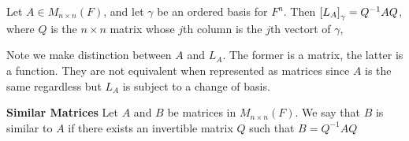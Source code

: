 \documentclass[11pt]{article}
\begin{document}
\begin{corollary*}
    Let $A\in M_{n\times n}(F)$, and let $\gamma$ be an ordered basis for $F^n$. Then $\left[ L_A \right]_{\gamma} = Q^{-1}AQ$, where $Q$ is the $n\times n$ matrix whose $j$th column is the $j$th vectort of $\gamma$, 
    \begin{rem}
        Note we make distinction between $A$ and $L_A$. The former is a matrix, the latter is a function. They are not equivalent when represented as matrices since $A$ is the same regardless but $L_A$ is subject to a change of basis. 
    \end{rem}    
\end{corollary*}

\begin{defn*}
    \textbf{Similar Matrices} Let $A$ and $B$ be matrices in $M_{n\times n}(F)$. We say that $B$ is similar to $A$ if there exists an invertible matrix $Q$ such that $B = Q^{-1}AQ$
\end{defn*}
\end{document}
